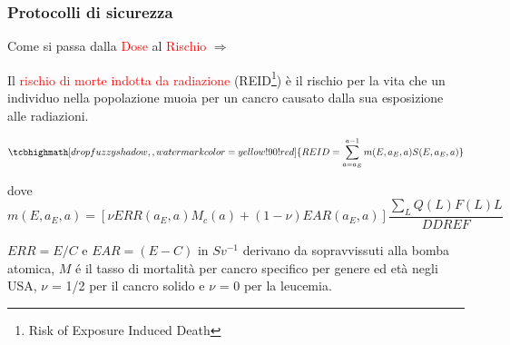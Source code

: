 \documentclass[9pt]{beamer}
\begin{document}
\begin{frame} [fragile]
	\frametitle{Protocolli di sicurezza}
	\begin{block}{}
	\center
Come si passa dalla \textcolor{red}{Dose} al \textcolor{red}{Rischio}  $\Longrightarrow$ 
\end{block}

\small
Il \textcolor{red}{rischio di morte indotta da radiazione} (REID\footnote{Risk of Exposure Induced Death}) \`e il rischio per la vita che un individuo nella popolazione muoia per un cancro causato dalla sua esposizione alle radiazioni.

\begin{equation*}
\tcbhighmath[drop fuzzy shadow, ,watermark color=yellow!90!red]{
REID = \sum\limits_{a=a_{E}}^{a-1} m(E,a_{E},a) S(E,a_{E},a) }
\end{equation*}


dove
\begin{equation*}
m(E,a_{E},a) = [\nu ERR(a_{E},a) M_{c}(a) + (1 -\nu) EAR(a_{E}, a)] \frac{\sum\limits_{L} Q(L)F(L) L }{DDREF}
\end{equation*}

$ERR=E/C$ e $EAR=(E-C)$ in $Sv^{-1}$ derivano da sopravvissuti alla bomba atomica, $M$  \'e il tasso di mortalit\`a per cancro specifico per genere ed et\`a negli USA,\newline
 $\nu$ = 1/2 per il cancro solido e $\nu$ = 0 per la leucemia.

\end{frame}

	
\end{document}
